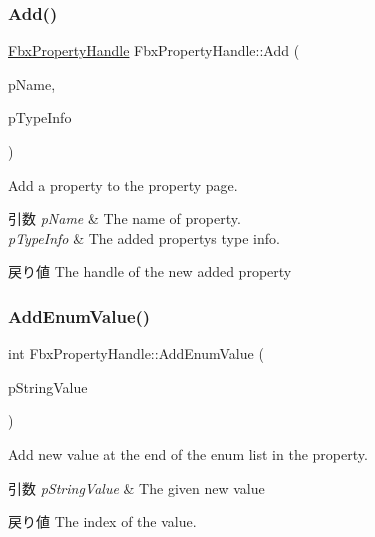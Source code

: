 \subsubsection{\texorpdfstring{Add()}{Add()}}
{\footnotesize\ttfamily \hyperlink{class_fbx_property_handle}{Fbx\+Property\+Handle} Fbx\+Property\+Handle\+::\+Add (\begin{DoxyParamCaption}\item[{const char $\ast$}]{p\+Name,  }\item[{const \hyperlink{class_fbx_property_handle}{Fbx\+Property\+Handle} \&}]{p\+Type\+Info }\end{DoxyParamCaption})}

Add a property to the property page. 
\begin{DoxyParams}{引数}
{\em p\+Name} & The name of property. \\
\hline
{\em p\+Type\+Info} & The added property\textquotesingle{}s type info. \\
\hline
\end{DoxyParams}
\begin{DoxyReturn}{戻り値}
The handle of the new added property 
\end{DoxyReturn}
\mbox{\label{class_fbx_property_handle_acae1f5d8ca9ae53a6a926179913bea07}} 
\subsubsection{\texorpdfstring{Add\+Enum\+Value()}{AddEnumValue()}}
{\footnotesize\ttfamily int Fbx\+Property\+Handle\+::\+Add\+Enum\+Value (\begin{DoxyParamCaption}\item[{const char $\ast$}]{p\+String\+Value }\end{DoxyParamCaption})}

Add new value at the end of the enum list in the property. 
\begin{DoxyParams}{引数}
{\em p\+String\+Value} & The given new value \\
\hline
\end{DoxyParams}
\begin{DoxyReturn}{戻り値}
The index of the value. 
\end{DoxyReturn}
\mbox{\label{class_fbx_property_handle_a1845e4c188e4557e44a1052c5d03d08f}} 
